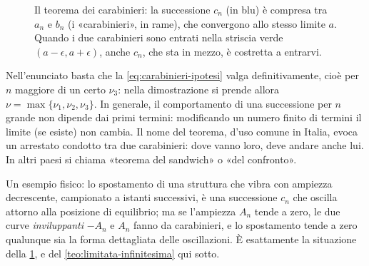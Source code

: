 \begin{figure}[htb]
\centering
{}
\caption{Il teorema dei carabinieri: la successione $c_{n}$ (in blu) è compresa tra
$a_{n}$ e $b_{n}$ (i «carabinieri», in rame), che convergono allo stesso limite $a$.
Quando i due carabinieri sono entrati nella striscia verde $(a-\epsilon,a+\epsilon)$,
anche $c_{n}$, che sta in mezzo, è costretta a entrarvi.}
\label{fig:carabinieri}
\end{figure}

\begin{osservazione}
Nell'enunciato basta che la \eqref{eq:carabinieri-ipotesi} valga definitivamente, cioè
per $n$ maggiore di un certo $\nu_{3}$: nella dimostrazione si prende allora
$\nu=\max\{\nu_{1},\nu_{2},\nu_{3}\}$. In generale, il comportamento di una successione
per $n$ grande non dipende dai primi termini: modificando un numero finito di termini il
limite (se esiste) non cambia. Il nome del teorema, d'uso comune in Italia, evoca un
arrestato condotto tra due carabinieri: dove vanno loro, deve andare anche lui. In altri
paesi si chiama «teorema del sandwich» o «del confronto».
\end{osservazione}

\begin{idea}
Un esempio fisico: lo spostamento di una struttura che vibra con ampiezza decrescente,
campionato a istanti successivi, è una successione $c_{n}$ che oscilla attorno alla
posizione di equilibrio; ma se l'ampiezza $A_{n}$ tende a zero, le due curve
\emph{inviluppanti} $-A_{n}$ e $A_{n}$ fanno da carabinieri, e lo spostamento tende a
zero qualunque sia la forma dettagliata delle oscillazioni. È esattamente la situazione
della \cref{fig:carabinieri}, e del \cref{teo:limitata-infinitesima} qui sotto.
\end{idea}


